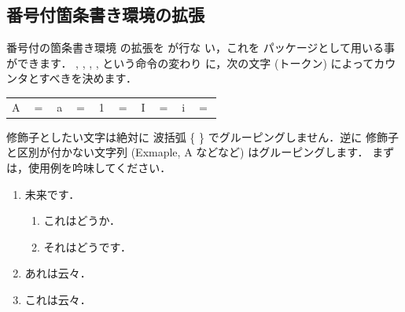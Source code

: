 {%


\subsection{番号付箇条書き環境の拡張\zdash{}}

番号付の箇条書き環境  の拡張を が行な
い，これを  パッケージとして用いる事ができます．
, , , ,  という命令の変わり
に，次の文字 (トークン) によってカウンタとすべきを決めます．

\begin{Syntax}
\begin{tabular}{LCCCC}
 A &$=$   &  a &$=$   & 1 &$=$  & 
 I &$=$  &  i &$=$  \\
\end{tabular}
\end{Syntax}
修飾子としたい文字は絶対に 波括弧 \{ \} でグルーピングしません．逆に
修飾子と区別が付かない文字列 (Exmaple, A などなど) はグルーピングします．
まずは，使用例を吟味してください．

\begin{InOut}
\usepackage{okumacro,graphicx}
\usepackage{enumerate}
\begin{enumerate}[{例題} 1]
  \item\label{exe:a} 未来です．
   \begin{enumerate}
    \item これはどうか．
    \item それはどうです．
   \end{enumerate}
  \item あれは云々．
  \item これは云々．
\end{enumerate}
\end{InOut}

}
